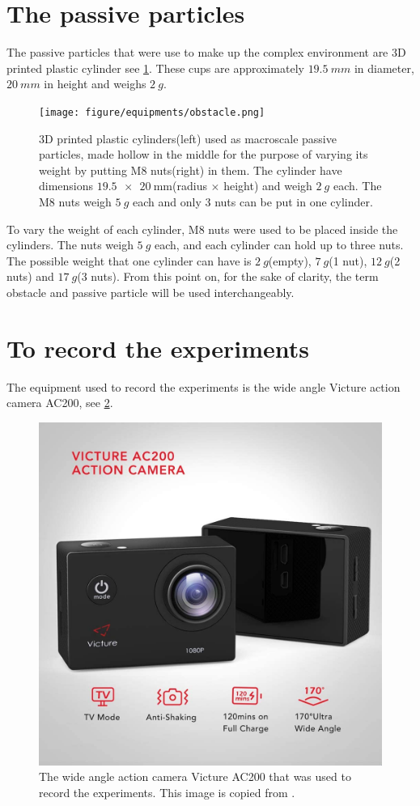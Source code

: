 \section{The passive particles}

The passive particles that were use to make up the complex environment are 3D printed plastic cylinder see \cref{fig:obstacle}. 
These cups are approximately $\SI{19.5}{mm}$ in diameter, $\SI{20}{mm}$ in height and weighs $\SI{2}{g}$.

\begin{figure}[htpb!]
    \centering
    \texttt{[image: figure/equipments/obstacle.png]}
    \caption{3D printed plastic cylinders(left) used as macroscale passive particles, made hollow in the 
    middle for the purpose of varying its weight by putting M8 nuts(right) in them. The cylinder 
    have dimensions $\SI[product-units = single]{19.5 x 20}{\milli\metre}$(radius $\times$ height) and 
    weigh $\SI{2}{g}$ each. The M8 nuts weigh $\SI{5}{g}$ each and only 3 nuts can be put in one cylinder.}
    \label{fig:obstacle}
\end{figure}

To vary the weight of each cylinder, M8 nuts were used to be placed inside the cylinders. The nuts weigh 
$\SI{5}{g}$ each, and each cylinder can hold up to three nuts. The possible weight that one cylinder can 
have is $\SI{2}{g}$(empty), $\SI{7}{g}$(1 nut), $\SI{12}{g}$(2 nuts) and $\SI{17}{g}$(3 nuts).
From this point on, for the sake of clarity, the term obstacle and passive particle will be used 
interchangeably.


\section{To record the experiments}

The equipment used to record the experiments is the wide angle Victure action camera AC200\cite{victure}, see \cref{fig:victure}.

\begin{figure}[htpb!]
    \centering
    \includegraphics[width=.3\textwidth]
    {figure/equipments/victure.jpg}
    \caption{The wide angle action camera Victure AC200 that was used to record the experiments. 
    This image is copied from \cite{victure_amazon}.}
    \label{fig:victure}
\end{figure}

